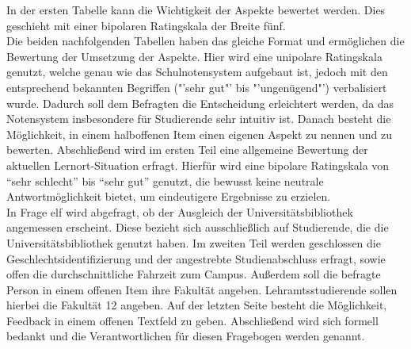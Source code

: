 \documentclass[11pt, a4paper]{article}
\begin{document}
In der ersten Tabelle kann die Wichtigkeit der Aspekte bewertet werden. Dies geschieht mit einer bipolaren Ratingskala der Breite fünf.\\
Die beiden nachfolgenden Tabellen haben das gleiche Format und ermöglichen die Bewertung der Umsetzung der Aspekte. Hier wird eine unipolare Ratingskala genutzt, welche genau wie das Schulnotensystem aufgebaut ist, jedoch
mit den entsprechend bekannten Begriffen ("'sehr gut"' bis "'ungenügend"') verbalisiert wurde.
Dadurch soll dem Befragten die Entscheidung erleichtert werden, da das Notensystem insbesondere für Studierende sehr intuitiv ist. 
Danach besteht die Möglichkeit, in einem halboffenen Item einen eigenen Aspekt zu nennen und zu bewerten.
Abschließend wird im ersten Teil eine allgemeine Bewertung der aktuellen Lernort-Situation erfragt.
Hierfür wird eine bipolare Ratingskala von “sehr schlecht” bis “sehr gut” genutzt, die bewusst keine neutrale Antwortmöglichkeit bietet, um eindeutigere Ergebnisse zu erzielen.\\
In Frage elf wird abgefragt, ob der Ausgleich der Universitätsbibliothek angemessen erscheint. Diese bezieht sich ausschließlich auf Studierende, die die Universitätsbibliothek genutzt haben.
Im zweiten Teil werden geschlossen die Geschlechtsidentifizierung und der angestrebte Studienabschluss erfragt, sowie offen die durchschnittliche Fahrzeit zum Campus.
Außerdem soll die befragte Person in einem offenen Item ihre Fakultät angeben.
Lehramtsstudierende sollen hierbei die Fakultät 12 angeben.
Auf der letzten Seite besteht die Möglichkeit, Feedback in einem offenen Textfeld zu geben.
Abschließend wird sich formell bedankt und die Verantwortlichen für diesen Fragebogen werden genannt.\\
\end{document}
